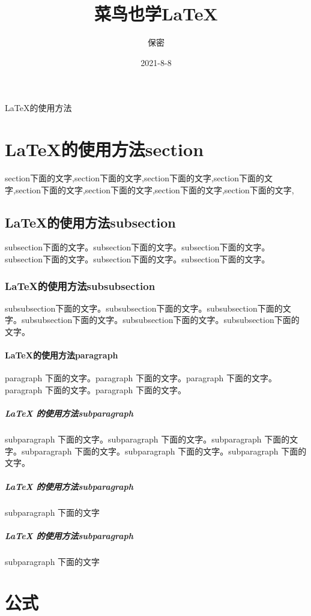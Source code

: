 \documentclass[utf-8,a4paper,11pt]{article}
\title{菜鸟也学\LaTeX}
\author{保密}
\date{2021-8-8}
\begin{document}
\maketitle


\LaTeX 的使用方法

\section{LaTeX的使用方法section}
section下面的文字,section下面的文字,section下面的文字,section下面的文字,section下面的文字,section下面的文字,section下面的文字,section下面的文字,

\subsection{LaTeX的使用方法subsection}
subsection下面的文字。subsection下面的文字。subsection下面的文字。subsection下面的文字。subsection下面的文字。subsection下面的文字。

\subsubsection{LaTeX的使用方法subsubsection}
subsubsection下面的文字。subsubsection下面的文字。subsubsection下面的文字。subsubsection下面的文字。subsubsection下面的文字。subsubsection下面的文字。

\paragraph{\LaTeX{}的使用方法paragraph}
paragraph 下面的文字。paragraph 下面的文字。paragraph 下面的文字。paragraph 下面的文字。paragraph 下面的文字。

\subparagraph{\LaTeX{} 的使用方法subparagraph}
subparagraph 下面的文字。subparagraph 下面的文字。subparagraph 下面的文字。subparagraph 下面的文字。subparagraph 下面的文字。subparagraph 下面的文字。

\subparagraph{\LaTeX{} 的使用方法subparagraph}
subparagraph 下面的文字

\subparagraph{\LaTeX{} 的使用方法subparagraph}
subparagraph 下面的文字

\section{公式}
\end{document}
